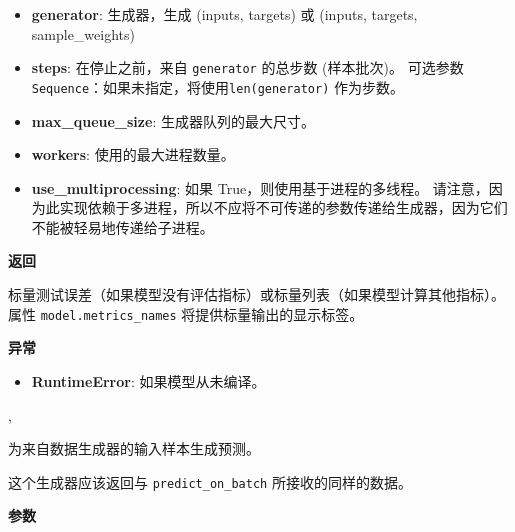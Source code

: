 \begin{itemize}
\tightlist
\item
  \textbf{generator}: 生成器，生成 (inputs, targets) 或 (inputs,
  targets, sample\_weights)
\item
  \textbf{steps}: 在停止之前，来自 \texttt{generator} 的总步数
  (样本批次)。 可选参数
  \texttt{Sequence}：如果未指定，将使用\texttt{len(generator)}
  作为步数。
\item
  \textbf{max\_queue\_size}: 生成器队列的最大尺寸。
\item
  \textbf{workers}: 使用的最大进程数量。
\item
  \textbf{use\_multiprocessing}: 如果 True，则使用基于进程的多线程。
  请注意，因为此实现依赖于多进程，所以不应将不可传递的参数传递给生成器，因为它们不能被轻易地传递给子进程。
\end{itemize}

\textbf{返回}

标量测试误差（如果模型没有评估指标）或标量列表（如果模型计算其他指标）。
属性 \texttt{model.metrics\_names} 将提供标量输出的显示标签。

\textbf{异常}

\begin{itemize}
\tightlist
\item
  \textbf{RuntimeError}: 如果模型从未编译。
\end{itemize}



\label{predictux5fgenerator}

\begin{Shaded}
\begin{Highlighting}[]
\OperatorTok{=}\OperatorTok{=}\OperatorTok{=}, \\
\hspace{4cm}\OperatorTok{=}\OperatorTok{=}\NormalTok{)}
\end{Highlighting}
\end{Shaded}

为来自数据生成器的输入样本生成预测。

这个生成器应该返回与 \texttt{predict\_on\_batch} 所接收的同样的数据。

\textbf{参数}

